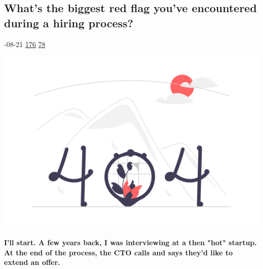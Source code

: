 \documentclass[10pt,a4paper]{article}
\begin{document}
\begin{multicols*}{2}
\begin{minipage}{\linewidth}
\subsection{What's the biggest red flag you've encountered during a hiring process?}
\textsc{\footnotesize
{\scriptsize\faCalendar}-08-21 
{\scriptsize\faThumbsOUp}\space 
\href{}{176} 
{\scriptsize\faComments}\space 
\href{}{78} 
}
\par\medskip\noindent
\href{https://news.ycombinator.com/item?id=37210581\&utm\_source=hackernewsletter\&utm\_medium=email\&utm\_term=ask\_hn}{
    \includegraphics[width=0.99\linewidth]{notfound.png}
}
\end{minipage}
\paragraph{}
\textbf{I'll start.
A few years back, I was interviewing at a then "hot" startup. At the end of the process, the CTO calls and says they'd like to extend an offer.}

\end{multicols*}
\end{document}
